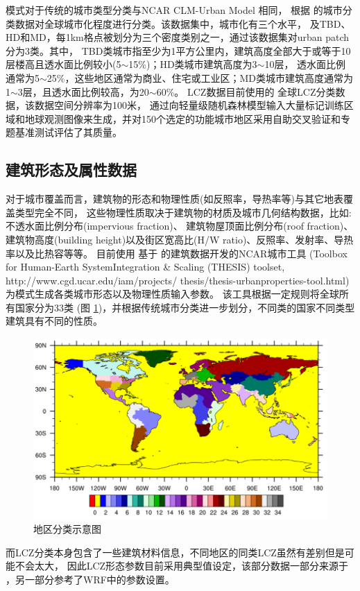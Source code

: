 模式对于传统的城市类型分类与NCAR CLM-Urban Model \citep{oleson2020parameterization} 相同，
根据 \citet{jackson2013parameterization} 的城市分类数据对全球城市化程度进行分类。该数据集中，城市化有三个水平，
及TBD、HD和MD，每1km格点被划分为三个密度类别之一，通过该数据集对urban patch分为3类。其中，
TBD类城市指至少为1平方公里内，建筑高度全部大于或等于10层楼高且透水面比例较小(5$\sim$15\%)；HD类城市建筑高度为3$\sim$10层，
透水面比例通常为5$\sim$25\%，这些地区通常为商业、住宅或工业区；MD类城市建筑高度通常为1$\sim$3层，且透水面比例较高，为20$\sim$60\%。
LCZ数据目前使用的 \citet{demuzere2022global} 全球LCZ分类数据，该数据空间分辨率为100米，
通过向轻量级随机森林模型输入大量标记训练区域和地球观测图像来生成，并对150个选定的功能城市地区采用自助交叉验证和专题基准测试评估了其质量。

\subsection{建筑形态及属性数据}\label{建筑形态及属性数据}
对于城市覆盖而言，建筑物的形态和物理性质(如反照率，导热率等)与其它地表覆盖类型完全不同，
这些物理性质取决于建筑物的材质及城市几何结构数据，比如: 不透水面比例分布(impervious fraction)、
建筑物屋顶面比例分布(roof fraction)、建筑物高度(building height)以及街区宽高比(H/W ratio)、反照率、发射率、导热率以及比热容等等。
目前使用 \citet{oleson2020parameterization} 基于 \citet{jackson2013parameterization} 的建筑数据开发的NCAR城市工具
(Toolbox for Human-Earth SystemIntegration \& Scaling (THESIS) toolset, http://www.cgd.ucar.edu/iam/projects/
thesis/thesis-urbanproperties-tool.html)为模式生成各类城市形态以及物理性质输入参数。
该工具根据一定规则将全球所有国家分为33类 (图 \ref{fig:地区分类})，并根据传统城市分类进一步划分，不同类的国家不同类型建筑具有不同的性质。
{
\begin{figure}[]
\centering
\includegraphics{Figures/地表输入数据/地区分类.png}
\caption{地区分类示意图}
\label{fig:地区分类}
\end{figure}
}
而LCZ分类本身包含了一些建筑材料信息，不同地区的同类LCZ虽然有差别但是可能不会太大，
因此LCZ形态参数目前采用典型值设定，该部分数据一部分来源于 \citet{stewart2014evaluation}，另一部分参考了WRF中的参数设置。
